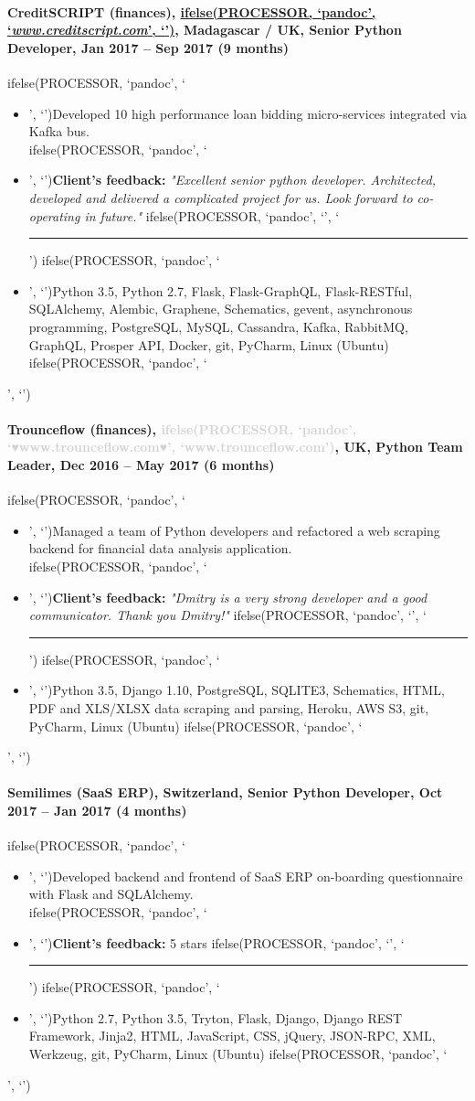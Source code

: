 \documentclass[a4paper,8pt]{extarticle}
\newcommand{\chref}[2]{\href{#1}
{ifelse(PROCESSOR, `pandoc', `#2', `\underline{\smash{#2}}')}}
\newcommand{\itchref}[2]{\chref{#1}{\textit{#2}}}  %
\newcommand{\chrule}{ifelse(PROCESSOR, `pandoc', `', `\vspace{3pt}\hrule')}
\newcommand{\brokenhreflg}[1]{\textcolor{lightgray}{ifelse(PROCESSOR, `pandoc', `♥#1♥', `#1')}}
\newcommand{\pdbeginitemize}{ifelse(PROCESSOR, `pandoc', `\begin{itemize}', `')}
\newcommand{\pditem}{ifelse(PROCESSOR, `pandoc', `\item', `')}
\newcommand{\pdenditemize}{ifelse(PROCESSOR, `pandoc', `\end{itemize}', `')}
\begin{document}
\paragraph*{CreditSCRIPT (finances), \itchref{https://www.creditscript.com}{www.creditscript.com}, Madagascar / UK, Senior Python Developer, Jan 2017 -- Sep 2017 (9 months)}
\pdbeginitemize
\pditem Developed 10 high performance loan bidding micro-services integrated via Kafka bus.\\
\pditem \textbf{Client's feedback:} \textit{"Excellent senior python developer. Architected, developed and delivered a complicated project for us. Look forward to co-operating in future."}
\chrule
\pditem Python 3.5, Python 2.7, Flask, Flask-GraphQL, Flask-RESTful, SQLAlchemy, Alembic, Graphene, Schematics, gevent, asynchronous programming, PostgreSQL, MySQL, Cassandra, Kafka, RabbitMQ, GraphQL, Prosper API, Docker, git, PyCharm, Linux (Ubuntu)
\pdenditemize

\paragraph*{Trounceflow (finances), \brokenhreflg{www.trounceflow.com}, UK, Python Team Leader, Dec 2016 -- May 2017 (6 months)}
\pdbeginitemize
\pditem Managed a team of Python developers and refactored a web scraping backend for financial data analysis application.\\
\pditem \textbf{Client's feedback:} \textit{"Dmitry is a very strong developer and a good communicator. Thank you Dmitry!"}
\chrule
\pditem Python 3.5, Django 1.10, PostgreSQL, SQLITE3, Schematics, HTML, PDF and XLS/XLSX data scraping and parsing, Heroku, AWS S3, git, PyCharm, Linux (Ubuntu)
\pdenditemize

\paragraph*{Semilimes (SaaS ERP), Switzerland, Senior Python Developer, Oct 2017 -- Jan 2017 (4 months)}
\pdbeginitemize
\pditem Developed backend and frontend of SaaS ERP on-boarding questionnaire with Flask and SQLAlchemy.\\
\pditem \textbf{Client's feedback:} 5 stars
\chrule
\pditem Python 2.7, Python 3.5, Tryton, Flask, Django, Django REST Framework, Jinja2, HTML, JavaScript, CSS, jQuery, JSON-RPC, XML, Werkzeug, git, PyCharm, Linux (Ubuntu)
\pdenditemize
\end{document}
